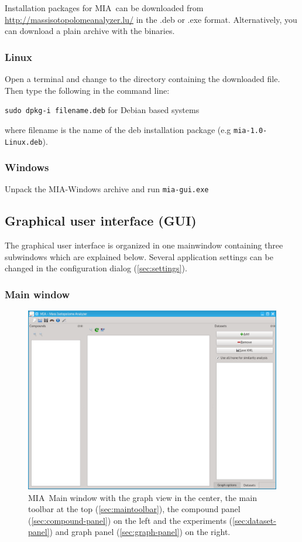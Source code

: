 \documentclass[a4paper,12pt]{scrartcl}
\newcommand*\app{\textsc{MIA}}
\begin{document}
Installation packages for \app\ can be downloaded from \url{http://massisotopolomeanalyzer.lu/} in the .deb or .exe format. Alternatively, you can download a plain archive with the binaries.

\subsubsection{Linux}

Open a terminal and change to the directory containing the downloaded file. Then type the following in the command line:


\texttt{sudo dpkg-i filename.deb} for Debian based systems

where filename is the name of the deb %
installation package (e.g \texttt{mia-1.0-Linux.deb}).

\subsubsection{Windows}

Unpack the \app-Windows archive and run \texttt{mia-gui.exe}

\subsection{Graphical user interface (GUI)}
\label{sec:gui}

The graphical user interface is organized in one mainwindow containing three subwindows which are explained below. Several application settings can be changed in the configuration dialog (\ref{sec:settings}).

\subsubsection{Main window}

\label{sec:mainwindow}

\begin{figure}[htb]
 \centering
 \includegraphics[width=0.8\linewidth]{./gfx/ss_mainwindow_empty.png}
 \caption{\app\ Main window with the graph view in the center, the main toolbar at the top (\ref{sec:maintoolbar}), the compound panel (\ref{sec:compound-panel}) on the left and the experiments (\ref{sec:dataset-panel}) and graph panel (\ref{sec:graph-panel}) on the right.}
 \label{fig:mainwindow}
\end{figure}
\end{document}
